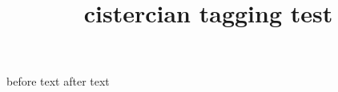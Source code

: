\documentclass{article}
\title{cistercian tagging test}
\begin{document}
before text  after text
\end{document}
